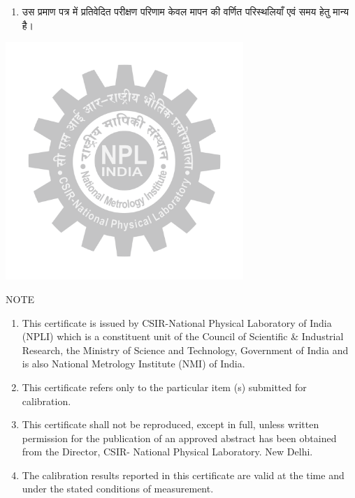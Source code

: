\documentclass[a4paper]{article}
\begin{document}
{{\begin{spacing}{0.8}
\begin{enumerate}
    \item \texthindi{उस प्रमाण पत्र में प्रतिवेदित परीक्षण परिणाम केवल मापन की वर्णित परिस्थलियाँ एवं समय हेतु मान्य है।}
    \end{enumerate}
    \end{spacing}
    \centering \includegraphics[width=9cm, height=9cm]{NPL_logo_gray.png}

    \begin{center}\LARGE NOTE\end{center}
    \begin{spacing}{0.8}
    \begin{enumerate}
    \item This certificate is issued by CSIR-National Physical Laboratory of India (NPLI) which is a constituent unit of the Council of Scientific \& Industrial Research, the Ministry of Science and Technology, Government of India and is also National Metrology Institute (NMI) of India.
    \item This certificate refers only to the particular item (s) submitted for calibration.
    \item This certificate shall not be reproduced, except in full, unless written permission for the publication of an approved abstract has been obtained from the Director, CSIR- National Physical Laboratory. New Delhi.
    \item The calibration results reported in this certificate are valid at the time and under the stated conditions of measurement.

    \end{enumerate}
    \end{spacing}
    }}

    
\end{document}
